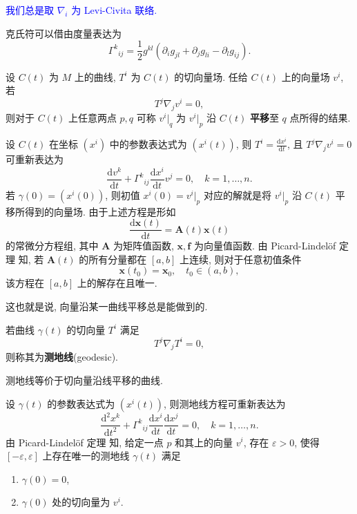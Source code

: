 \textcolor{blue}{我们总是取 $\nabla_i$ 为 Levi-Civita 联络.}

\begin{theorem}
\label{Gamma-g}
	克氏符可以借由度量表达为
	\[ \Gamma^{k}{}_{ij}=\frac{1}{2}g^{kl}\left( \partial_i g_{jl}+\partial_j g_{li}-\partial_l g_{ij} \right). \]
\end{theorem}

\begin{definition}[平移]
	设 $C(t)$ 为 $M$ 上的曲线, $T^i$ 为 $C(t)$ 的切向量场. 任给 $C(t)$ 上的向量场 $v^i$, 若
	\[ T^j\nabla_jv^i=0, \]
	则对于 $C(t)$ 上任意两点 $p,q$ 可称 $v^i|_q$ 为 $v^i|_p$ 沿 $C(t)$ {\bf 平移}至 $q$ 点所得的结果.
\end{definition}
设 $C(t)$ 在坐标 $(x^i)$ 中的参数表达式为 $(x^i(t))$, 则 $\displaystyle T^i=\frac{\mathrm{d} x^i}{\mathrm{d} t}$, 且 $T^j\nabla_jv^i=0$ 可重新表达为
\[ \frac{\mathrm{d} v^k}{\mathrm{d} t}+\Gamma^k{}_{ij}\frac{\mathrm{d} x^i}{\mathrm{d} t}v^j=0, \quad k=1,\dots,n.\]
若 $\gamma(0)=(x^i(0))$, 则初值 $x^i(0)=v^i|_p$ 对应的解就是将 $v^i|_p$ 沿 $C(t)$ 平移所得到的向量场. 由于上述方程是形如
\[ \frac{\mathrm{d}\mathbf{x}(t)}{\mathrm{d}t}=\mathbf{A}(t)\mathbf{x}(t) \] 
的常微分方程组, 其中 $\mathbf{A}$ 为矩阵值函数, $\mathbf{x},\mathbf{f}$ 为向量值函数. 由 Picard-Lindel\"{o}f 定理\cite[64 页, 定理 3.1]{丁同仁2004常微分方程} 知, 若 $\mathbf{A}(t)$ 的所有分量都在 $[a,b]$ 上连续, 则对于任意初值条件 
\[ \mathbf{x}(t_0)=\mathbf{x}_0,\quad t_0\in(a,b), \] 
该方程在 $[a,b]$ 上的解存在且唯一.

这也就是说, 向量沿某一曲线平移总是能做到的.
\begin{definition}[测地线]
	\label{geodesic}
	若曲线 $\gamma(t)$ 的切向量 $T^i$ 满足
	\[ T^j\nabla_jT^i=0, \tag{测地线方程}\] 
	则称其为{\bf 测地线}(geodesic).
\end{definition}
\begin{remark}
	测地线等价于切向量沿线平移的曲线.
\end{remark}
设 $\gamma(t)$ 的参数表达式为 $(x^i(t))$, 则测地线方程可重新表达为
\[ \frac{\mathrm{d}^2 x^k}{\mathrm{d} t^2}+\Gamma^k{}_{ij}\frac{\mathrm{d} x^i}{\mathrm{d} t}\frac{\mathrm{d} x^j}{\mathrm{d} t}=0,\quad k=1,\dots,n. \] 
由 Picard-Lindel\"{o}f 定理\cite[64 页, 定理 3.1]{丁同仁2004常微分方程} 知, 给定一点 $p$ 和其上的向量 $v^i$, 存在 $\varepsilon>0$, 使得 $[-\varepsilon,\varepsilon]$ 上存在唯一的测地线 $\gamma(t)$ 满足
\begin{enumerate}
	\item $\gamma(0)=0$,
	\item $\gamma(0)$ 处的切向量为 $v^i$.
\end{enumerate}

